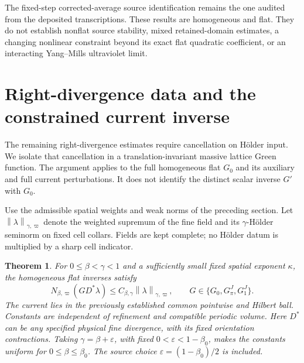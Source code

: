 \documentclass[11pt]{article}
\newtheorem{theorem}{Theorem}[section]
\newcommand{\norm}[1]{\left\lVert#1\right\rVert}
\begin{document}
The fixed-step corrected-average source identification remains the
one audited from the deposited transcriptions. These results are
homogeneous and flat. They do not establish nonflat source stability,
mixed retained-domain estimates, a changing nonlinear constraint
beyond its exact flat quadratic coefficient, or an interacting
Yang--Mills ultraviolet limit.

\section{Right-divergence data and the constrained current inverse}
\label{rd-section}

The remaining right-divergence estimates require cancellation on
H\"older input. We isolate that cancellation in a translation-invariant
massive lattice Green function. The argument applies to the full
homogeneous flat $G_0$ and its auxiliary and full current perturbations.
It does not identify the distinct scalar inverse $G'$ with $G_0$.

Use the admissible spatial weights and weak norms of the preceding
section. Let $\norm{\lambda}_{\gamma,\varpi}$ denote the weighted
supremum of the fine field and its $\gamma$-H\"older seminorm on
fixed cell collars. Fields are kept complete; no H\"older datum is
multiplied by a sharp cell indicator.

\begin{theorem}\label{rd-theorem}
For $0\le\beta<\gamma<1$ and a sufficiently small fixed spatial
exponent $\kappa$, the homogeneous flat inverses satisfy
\begin{equation}\label{rd-main-estimate}
 N_{\beta,\varpi}(G D^*\lambda)
       \le C_{\beta,\gamma}\norm{\lambda}_{\gamma,\varpi},
 \qquad G\in\{G_0,G_\pi^J,G_1^J\}.
\end{equation}
The current lies in the previously established common pointwise and
Hilbert ball. Constants are independent of refinement and compatible
periodic volume. Here $D^*$ can be any specified physical fine
divergence, with its fixed orientation contractions. Taking
$\gamma=\beta+\varepsilon$, with fixed
$0<\varepsilon<1-\beta_0$, makes the constants uniform for
$0\le\beta\le\beta_0$. The source choice
$\varepsilon=(1-\beta_0)/2$ is included.
\end{theorem}
\end{document}
